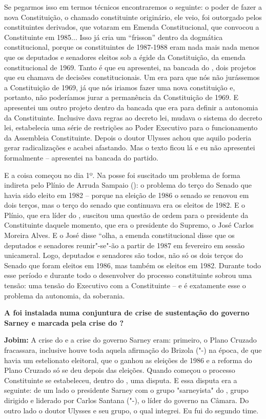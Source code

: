 Se pegarmos isso em termos técnicos encontraremos o seguinte: o poder de
fazer a nova Constituição, o chamado constituinte originário, ele veio,
foi outorgado pelos constituintes derivados, que votaram em Emenda
Constitucional, que convocou a Constituinte em 1985... Isso já cria um
``frisson'' dentro da dogmática constitucional, porque os constituintes
de 1987-1988 eram nada mais nada menos que os deputados e senadores
eleitos sob a égide da Constituição, da emenda constitucional de 1969.
Tanto é que eu apresentei, na bancada do , dois projetos que eu
chamava de decisões constitucionais. Um era para que nós não jurássemos
a Constituição de 1969, já que nós iriamos fazer uma nova constituição
e, portanto, não poderíamos jurar a permanência da Constituição de 1969.
E apresentei um outro projeto dentro da bancada que era para definir a
autonomia da Constituinte. Inclusive dava regras ao decreto lei, mudava
o sistema do decreto lei, estabelecia uma série de restrições ao Poder
Executivo para o funcionamento da Assembleia Constituinte. Depois o
doutor Ulysses achou que aquilo poderia gerar radicalizações e acabei
afastando. Mas o texto ficou lá e eu não apresentei formalmente --
apresentei na bancada do partido.

E a coisa começou no dia 1º. Na posse foi suscitado um problema de forma
indireta pelo Plínio de Arruda Sampaio (): o problema do terço do
Senado que havia sido eleito em 1982 -- porque na eleição de 1986 o
senado se renovou em dois terços, mas o terço do senado que continuava
era os eleitos de 1982. E o Plínio, que era líder do , suscitou uma
questão de ordem para o presidente da Constituinte daquele momento, que
era o presidente do Supremo, o José Carlos Moreira Alves. E o José disse
``olha, a emenda constitucional disse que os deputados e senadores
reunir"-se"-ão a partir de 1987 em fevereiro em sessão unicameral. Logo,
deputados e senadores são todos, não só os dois terços do Senado que
foram eleitos em 1986, mas também os eleitos em 1982. Durante todo esse
período e durante todo o desenvolver do processo constituinte sobrou uma
tensão: uma tensão do Executivo com a Constituinte -- e é exatamente
esse o problema da autonomia, da soberania.

\textbf{A  foi instalada numa conjuntura de crise de sustentação do
governo Sarney e marcada pela crise do ?}

\textbf{Jobim:} A crise do  e a crise do governo Sarney eram:
primeiro, o Plano Cruzado fracassara, inclusive houve toda aquela
afirmação do Brizola ("-) na época, de que havia um estelionato
eleitoral, que o  ganhou as eleições de 1986 e a reforma do Plano
Cruzado só se deu depois das eleições. Quando começou o processo
Constituinte se estabeleceu, dentro do , uma disputa. E essa disputa
era a seguinte: de um lado o presidente Sarney com o grupo "sarneyista"
do , grupo dirigido e liderado por Carlos Santana ("-), o líder
do governo na Câmara. Do outro lado o doutor Ulysses e seu grupo, o qual
integrei. Eu fui do segundo time.

